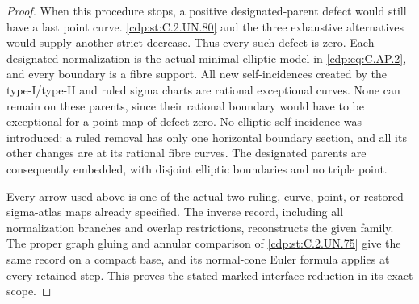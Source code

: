 \begin{proof}
When this procedure stops, a positive designated-parent
defect would still have a last point curve. \ref{cdp:st:C.2.UN.80} and the
three exhaustive alternatives would supply another strict
decrease. Thus every such defect is zero. Each designated
normalization is the actual minimal elliptic model in
\eqref{cdp:eq:C.AP.2}, and every boundary is a fibre support. All new
self-incidences created by the type-I/type-II and ruled
sigma charts are rational exceptional curves. None can
remain on these parents, since their rational boundary
would have to be exceptional for a point map of defect
zero. No elliptic self-incidence was introduced: a ruled
removal has only one horizontal boundary section, and all
its other changes are at its rational fibre curves. The
designated parents are consequently embedded, with disjoint
elliptic boundaries and no triple point.

Every arrow used above is one of the actual two-ruling,
curve, point, or restored sigma-atlas maps already specified.
The inverse record, including all normalization branches
and overlap restrictions, reconstructs the given family.
The proper graph gluing and annular comparison of \ref{cdp:st:C.2.UN.75}
give the same record on a compact base, and its normal-cone
Euler formula applies at every retained step. This proves
the stated marked-interface reduction in its exact scope.
\end{proof}


